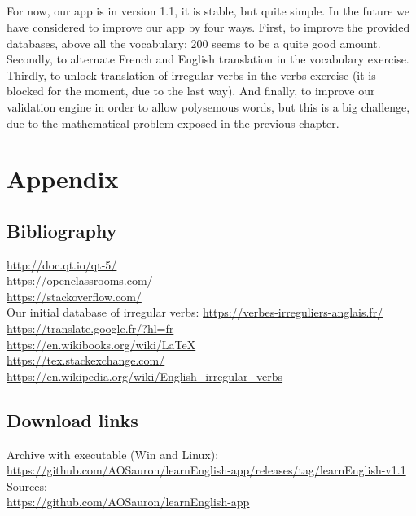 \documentclass[12pt, a4paper]{report}
\begin{document}
\paragraph{}For now, our app is in version 1.1, it is stable, but quite simple. In the future we have considered to improve our app by four ways. First, to improve the provided databases, above all the vocabulary: 200 seems to be a quite good amount. Secondly, to alternate French and English translation in the vocabulary exercise. Thirdly, to unlock translation of irregular verbs in the verbs exercise (it is blocked for the moment, due to the last way). And finally, to improve our validation engine in order to allow polysemous words, but this is a big challenge, due to the mathematical problem exposed in the previous chapter.

\newpage
\chapter*{Appendix}

\section*{\hspace{0.6cm}Bibliography}


\hspace{0.6cm}\url{http://doc.qt.io/qt-5/}\\

\url{https://openclassrooms.com/}\\

\url{https://stackoverflow.com/}\\

Our initial database of irregular verbs:
\url{https://verbes-irreguliers-anglais.fr/}\\

\url{https://translate.google.fr/?hl=fr}\\

\url{https://en.wikibooks.org/wiki/LaTeX}\\

\url{https://tex.stackexchange.com/}\\

\url{https://en.wikipedia.org/wiki/English_irregular_verbs}\\

\section*{\hspace{0.6cm}Download links}

\hspace{0.6cm}Archive with executable (Win and Linux):\\ 
\footnotesize{\url{https://github.com/AOSauron/learnEnglish-app/releases/tag/learnEnglish-v1.1}}\\

\normalsize{Sources:}\\
\footnotesize \url{https://github.com/AOSauron/learnEnglish-app}\\
\end{document}
